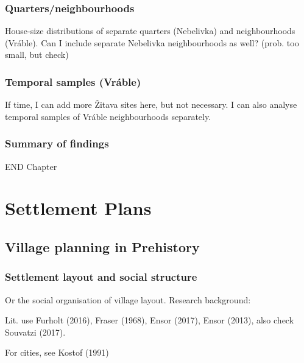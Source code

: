 \documentclass[
  12pt,
]{book}
\begin{document}
\hypertarget{quartersneighbourhoods}{%
\section{Quarters/neighbourhoods}\label{quartersneighbourhoods}}

House-size distributions of separate quarters (Nebelivka) and neighbourhoods (Vráble). Can I include separate Nebelivka neighbourhoods as well? (prob. too small, but check)

\hypertarget{temporal-samples-vruxe1ble}{%
\section{Temporal samples (Vráble)}\label{temporal-samples-vruxe1ble}}

If time, I can add more Žitava sites here, but not necessary. I can also analyse temporal samples of Vráble neighbourhoods separately.

\hypertarget{summary-of-findings}{%
\section{Summary of findings}\label{summary-of-findings}}

END Chapter

\hypertarget{part-settlement-plans}{%
\part{Settlement Plans}\label{part-settlement-plans}}

\hypertarget{images-theory}{%
\chapter{Village planning in Prehistory}\label{images-theory}}

\hypertarget{settlement-layout-and-social-structure}{%
\section{Settlement layout and social structure}\label{settlement-layout-and-social-structure}}

Or the social organisation of village layout. Research background:

Lit. use Furholt (2016), Fraser (1968), Ensor (2017), Ensor (2013), also check Souvatzi (2017).

For cities, see Kostof (1991)
\end{document}
